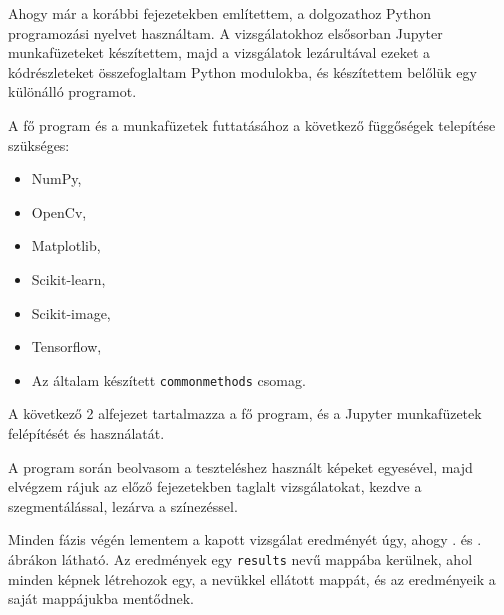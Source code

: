 
Ahogy már a korábbi fejezetekben említettem, a dolgozathoz Python programozási nyelvet használtam. A vizsgálatokhoz elsősorban Jupyter munkafüzeteket készítettem, majd a vizsgálatok lezárultával ezeket a kódrészleteket összefoglaltam Python modulokba, és készítettem belőlük egy különálló programot.

A fő program és a munkafüzetek futtatásához a következő függőségek telepítése szükséges:
\begin{itemize}
\item NumPy,
\item OpenCv,
\item Matplotlib,
\item Scikit-learn,
\item Scikit-image,
\item Tensorflow,
\item Az általam készített \texttt{commonmethods} csomag.
\end{itemize}

A következő 2 alfejezet tartalmazza a fő program, és a Jupyter munkafüzetek felépítését és használatát.


A program során beolvasom a teszteléshez használt képeket egyesével, majd elvégzem rájuk az előző fejezetekben taglalt vizsgálatokat, kezdve a szegmentálással, lezárva a színezéssel.

Minden fázis végén lementem a kapott vizsgálat eredményét úgy, ahogy . és . ábrákon látható. Az eredmények egy \texttt{results} nevű mappába kerülnek, ahol minden képnek létrehozok egy, a nevükkel ellátott mappát, és az eredményeik a saját mappájukba mentődnek.

